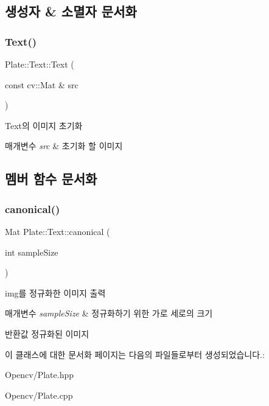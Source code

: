 \subsection{생성자 \& 소멸자 문서화}
\mbox{\label{class_plate_1_1_text_a7d9cc837bb93e89f5b8bd6aee6cd578b}} 
\subsubsection{\texorpdfstring{Text()}{Text()}}
{\footnotesize\ttfamily Plate\+::\+Text\+::\+Text (\begin{DoxyParamCaption}\item[{const cv\+::\+Mat \&}]{src }\end{DoxyParamCaption})}



Text의 이미지 초기화 


\begin{DoxyParams}{매개변수}
{\em src} & 초기화 할 이미지 \\
\hline
\end{DoxyParams}


\subsection{멤버 함수 문서화}
\mbox{\label{class_plate_1_1_text_a1fc8fd54d9274fac2740737f7b1e572e}} 
\subsubsection{\texorpdfstring{canonical()}{canonical()}}
{\footnotesize\ttfamily Mat Plate\+::\+Text\+::canonical (\begin{DoxyParamCaption}\item[{int}]{sample\+Size }\end{DoxyParamCaption})}



img를 정규화한 이미지 출력 


\begin{DoxyParams}{매개변수}
{\em sample\+Size} & 정규화하기 위한 가로 세로의 크기 \\
\hline
\end{DoxyParams}
\begin{DoxyReturn}{반환값}
정규화된 이미지 
\end{DoxyReturn}


이 클래스에 대한 문서화 페이지는 다음의 파일들로부터 생성되었습니다.\+:\begin{DoxyCompactItemize}
\item 
Opencv/Plate.\+hpp\item 
Opencv/Plate.\+cpp\end{DoxyCompactItemize}
